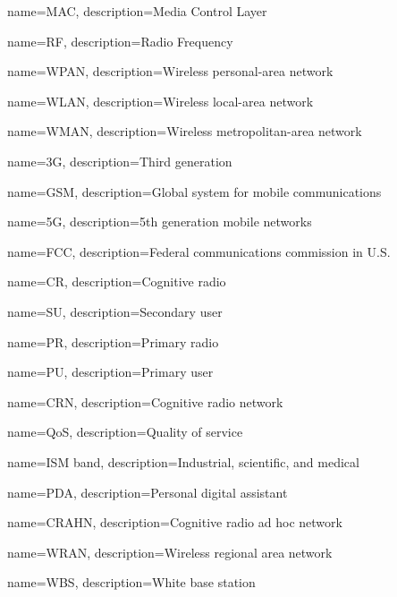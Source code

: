 {
    name=MAC,
    description={Media Control Layer}
}

{
    name=RF,
    description={Radio Frequency}
}


{
    name=WPAN,
    description={Wireless personal-area network}
}

{
    name=WLAN,
    description={Wireless local-area network}
}

{
    name=WMAN,
    description={Wireless metropolitan-area network}
}

{
    name=3G,
    description={Third generation}
}


{
    name=GSM,
    description={Global system for mobile communications}
}
 
 
 
{
    name=5G,
    description={5th generation mobile networks}
}
 
 
 
 
 


{
    name=FCC,
    description={Federal communications commission in U.S.}
}
 
 
{
    name=CR,
    description={Cognitive radio}
}

{
    name=SU,
    description={Secondary user}
}
 
{
    name=PR,
    description={Primary radio}
} 
 
{
    name=PU,
    description={Primary user}
}

 
{
    name=CRN,
    description={Cognitive radio network}
}
 
 
{
    name=QoS,
    description={Quality of service}
}


{
    name=ISM band,
    description={Industrial, scientific, and medical}
}

{
    name=PDA,
    description={Personal digital assistant}
}


{
    name=CRAHN,
    description={Cognitive radio ad hoc network}
}


{
    name=WRAN,
    description={Wireless regional area network}
}


{
    name=WBS,
    description={White base station}
}


